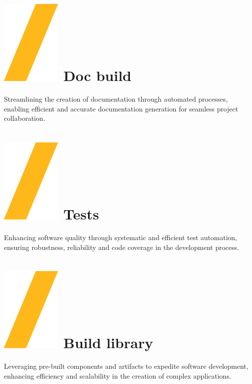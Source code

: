 \documentclass[a0paper,fleqn]{src/betterposter}
\begin{document}
{\section{\includegraphics[height=\fontcharht\font`\S]{img/general/slash.png} Doc build}
Streamlining the creation of documentation through automated processes, enabling
efficient and accurate documentation generation for seamless project
collaboration.

\section{\includegraphics[height=\fontcharht\font`\S]{img/general/slash.png} Tests}
Enhancing software quality through systematic and efficient test automation,
ensuring robustness, reliability and code coverage in the development process.




}{

\section{\includegraphics[height=\fontcharht\font`\S]{img/general/slash.png} Build library}
Leveraging pre-built components and artifacts to expedite software development,
enhancing efficiency and scalability in the creation of complex applications.

}
\end{document}
